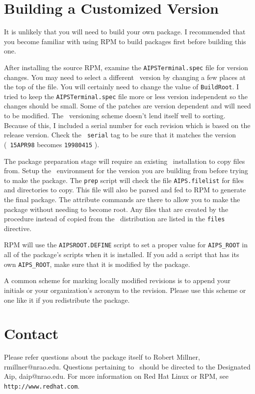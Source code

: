 \section{Building a Customized Version}

It is unlikely that you will need to build your own package.  I
recommended that you become familiar with using RPM to build packages
first before building this one.

After installing the source RPM, examine the {\tt AIPSTerminal.spec}
file for version changes.  You may need to select a different \AIPS\
version by changing a few places at the top of the file.  You will
certainly need to change the value of {\tt BuildRoot}.  I tried to keep
the {\tt AIPSTerminal.spec} file more or less version independent so the
changes should be small.  Some of the patches are version dependent and
will need to be modified.  The \AIPS\ versioning scheme doesn't lend
itself well to sorting.  Because of this, I included a serial number for
each revision which is based on the release version.  Check the {\tt
serial} tag to be sure that it matches the version (\ie\ {\tt 15APR98}
becomes {\tt 19980415} ).

The package preparation stage will require an existing \AIPS\
installation to copy files from.  Setup the \AIPS\ environment for the
version you are building from before trying to make the package.  The
{\tt prep} script will check the file {\tt AIPS.filelist} for files and
directories to copy.  This file will also be parsed and fed to RPM to
generate the final package.  The attribute commands are there to allow
you to make the package without needing to become root.  Any files that
are created by the procedure instead of copied from the \AIPS\
distribution are listed in the {\tt files} directive.

RPM will use the {\tt AIPSROOT.DEFINE} script to set a proper value for
{\tt AIPS\_ROOT} in all of the package's scripts when it is installed.
If you add a script that has its own {\tt AIPS\_ROOT}, make sure that it
is modified by the package.

A common scheme for marking locally modified revisions is to append your
initials or your organization's acronym to the revision.  Please use
this scheme or one like it if you redistribute the package.

\section{Contact}

Please refer questions about the package itself to Robert Millner,
rmillner@nrao.edu.  Questions pertaining to \AIPS\ should be directed to
the Designated Aip, daip@nrao.edu.  For more information on Red Hat
Linux or RPM, see {\tt http://www.redhat.com}.




